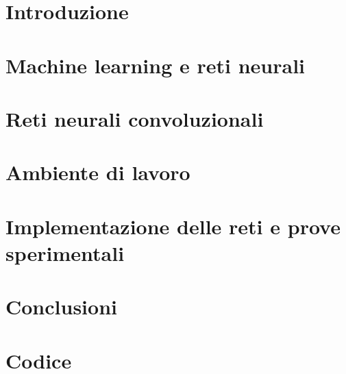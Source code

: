 \documentclass[12pt,a4paper]{report}
\begin{document}
 
\chapter{Introduzione}




\chapter{Machine learning e reti neurali}



\chapter{Reti neurali convoluzionali}

%

\normalfont
\chapter{Ambiente di lavoro}




\chapter{Implementazione delle reti e prove sperimentali}




\chapter{Conclusioni}



\chapter{Codice}

%





\cleardoublepage{} %
\end{document}
